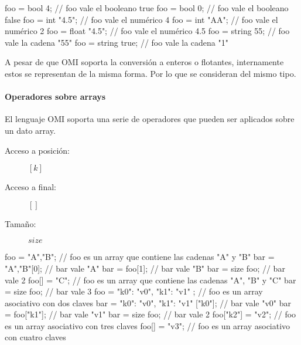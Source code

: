 \begin{myverbatim}
   foo = bool 4; // foo vale el booleano true
   foo = bool 0; // foo vale el booleano false
   foo = int "4.5"; // foo vale el numérico 4
   foo = int "AA"; // foo vale el numérico 2
   foo = float "4.5"; // foo vale el numérico 4.5
   foo = string 55; // foo vale la cadena "55" 
   foo = string true; // foo vale la cadena "1" 
\end{myverbatim} 

A pesar de que OMI soporta la conversión a enteros o flotantes, internamente estos se representan de la misma forma. Por lo que
se consideran del mismo tipo.


\paragraph{Operadores sobre arrays} \label{sec:op_array}
El lenguaje OMI soporta una serie de operadores que pueden ser aplicados sobre un dato array.

\begin{description}
\item [Acceso a posición:] $[k]$
\item [Acceso a final:] $[]$
\item [Tamaño:] $size$
\end{description} 

\begin{myverbatim}
   foo = {"A","B"}; // foo es un array que contiene las cadenas "A" y "B"
   bar = {"A","B"}[0]; // bar vale "A"
   bar = foo[1]; // bar vale "B"
   bar = size foo; // bar vale 2
   foo[] = "C"; // foo es un array que contiene las cadenas "A", "B" y "C"
   bar = size foo; // bar vale 3
   foo = { "k0": "v0", "k1": "v1" }; // foo es un array asociativo con dos claves
   bar = { "k0": "v0", "k1": "v1" }["k0"]; // bar vale "v0"
   bar = foo["k1"]; // bar vale "v1"
   bar = size foo; // bar vale 2
   foo["k2"] = "v2"; // foo es un array asociativo con tres claves
   foo[] = "v3"; // foo es un array asociativo con cuatro claves
\end{myverbatim} 

